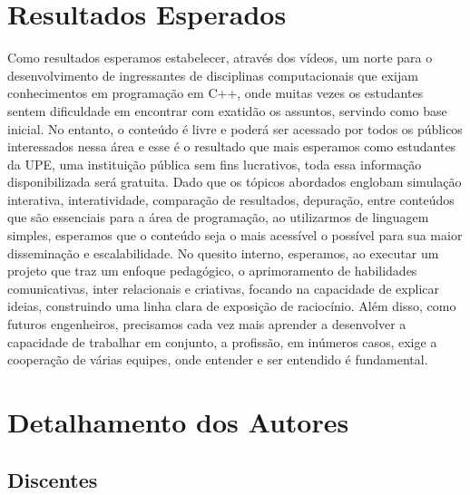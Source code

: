 \documentclass[a4paper,12pt]{article} %
\begin{document}
\section{Resultados Esperados}

Como resultados esperamos estabelecer, através dos vídeos, um norte para o desenvolvimento de ingressantes de disciplinas computacionais que exijam conhecimentos em programação em C++, onde muitas vezes os estudantes sentem dificuldade em encontrar com exatidão os assuntos, servindo como base inicial. No entanto, o conteúdo é livre e poderá ser acessado por todos os públicos interessados nessa área e esse é o resultado que mais esperamos como estudantes da UPE, uma instituição pública sem fins lucrativos, toda essa informação disponibilizada será gratuita.
Dado que os tópicos abordados englobam simulação interativa, interatividade, comparação de resultados, depuração, entre conteúdos que são essenciais para a área de programação, ao utilizarmos de linguagem simples, esperamos que o conteúdo seja o mais acessível o possível para sua maior disseminação e escalabilidade.
No quesito interno, esperamos, ao executar um projeto que traz um enfoque pedagógico, o aprimoramento de habilidades comunicativas, inter relacionais e criativas, focando na capacidade de explicar ideias, construindo uma linha clara de exposição de raciocínio. Além disso, como futuros engenheiros, precisamos cada vez mais aprender a desenvolver a capacidade de trabalhar em conjunto, a profissão, em inúmeros casos, exige a cooperação de várias equipes, onde entender e ser entendido é fundamental.

\section*{Detalhamento dos Autores}

\subsection*{Discentes}
\end{document}
